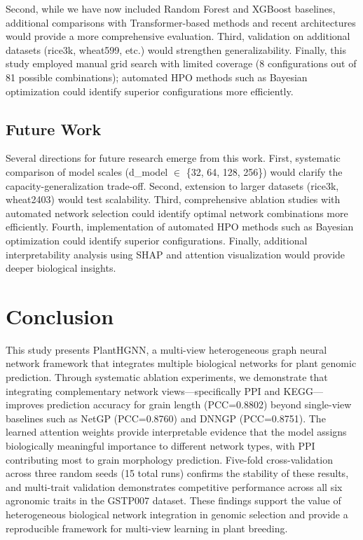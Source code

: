 \documentclass[11pt,a4paper]{article}
\begin{document}
Second, while we have now included Random Forest and XGBoost baselines, additional comparisons with Transformer-based methods and recent architectures would provide a more comprehensive evaluation. Third, validation on additional datasets (rice3k, wheat599, etc.) would strengthen generalizability. Finally, this study employed manual grid search with limited coverage (8 configurations out of 81 possible combinations); automated HPO methods such as Bayesian optimization could identify superior configurations more efficiently.

\subsection{Future Work}
\label{subsec:future}

Several directions for future research emerge from this work. First, systematic comparison of model scales (d\_model $\in$ \{32, 64, 128, 256\}) would clarify the capacity-generalization trade-off. Second, extension to larger datasets (rice3k, wheat2403) would test scalability. Third, comprehensive ablation studies with automated network selection could identify optimal network combinations more efficiently. Fourth, implementation of automated HPO methods such as Bayesian optimization could identify superior configurations. Finally, additional interpretability analysis using SHAP and attention visualization would provide deeper biological insights.

\section{Conclusion}
\label{sec:conclusion}

This study presents PlantHGNN, a multi-view heterogeneous graph neural network framework that integrates multiple biological networks for plant genomic prediction. Through systematic ablation experiments, we demonstrate that integrating complementary network views---specifically PPI and KEGG---improves prediction accuracy for grain length (PCC=0.8802) beyond single-view baselines such as NetGP (PCC=0.8760) and DNNGP (PCC=0.8751). The learned attention weights provide interpretable evidence that the model assigns biologically meaningful importance to different network types, with PPI contributing most to grain morphology prediction. Five-fold cross-validation across three random seeds (15 total runs) confirms the stability of these results, and multi-trait validation demonstrates competitive performance across all six agronomic traits in the GSTP007 dataset. These findings support the value of heterogeneous biological network integration in genomic selection and provide a reproducible framework for multi-view learning in plant breeding.
\end{document}

